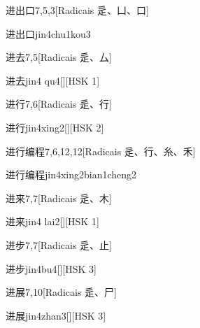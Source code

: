 \begin{entry}{进出口}{7,5,3}[Radicais ⾡、⼐、⼝]
  \begin{phonetics}{进出口}{jin4chu1kou3}
  \end{phonetics}
\end{entry}

\begin{entry}{进去}{7,5}[Radicais ⾡、⼛]
  \begin{phonetics}{进去}{jin4 qu4}[][HSK 1]
  \end{phonetics}
\end{entry}

\begin{entry}{进行}{7,6}[Radicais ⾡、⾏]
  \begin{phonetics}{进行}{jin4xing2}[][HSK 2]
  \end{phonetics}
\end{entry}

\begin{entry}{进行编程}{7,6,12,12}[Radicais ⾡、⾏、⽷、⽲]
  \begin{phonetics}{进行编程}{jin4xing2bian1cheng2}
  \end{phonetics}
\end{entry}

\begin{entry}{进来}{7,7}[Radicais ⾡、⽊]
  \begin{phonetics}{进来}{jin4 lai2}[][HSK 1]
  \end{phonetics}
\end{entry}

\begin{entry}{进步}{7,7}[Radicais ⾡、⽌]
  \begin{phonetics}{进步}{jin4bu4}[][HSK 3]
  \end{phonetics}
\end{entry}

\begin{entry}{进展}{7,10}[Radicais ⾡、⼫]
  \begin{phonetics}{进展}{jin4zhan3}[][HSK 3]
  \end{phonetics}
\end{entry}

